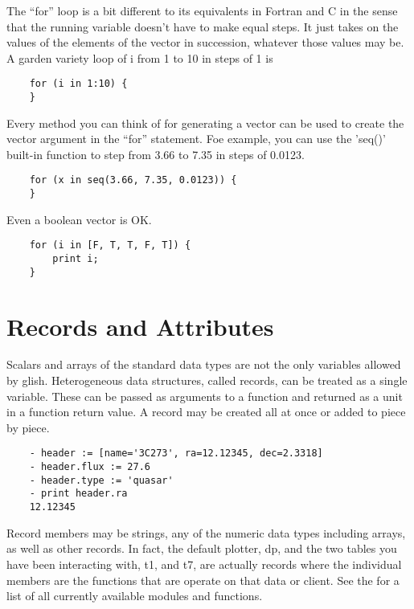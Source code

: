 The ``for'' loop is a bit different to its equivalents in Fortran and C in
the sense that the running variable doesn't have to make equal steps.  It
just takes on the values of the elements of the vector in succession,
whatever those values may be.  A garden variety loop of i from 1 to 10 in
steps of 1 is

\begin{verbatim}
	for (i in 1:10) {
	}
\end{verbatim}

Every method you can think of for generating a vector can be used to create
the vector argument in the ``for'' statement.  Foe example, you can use the
'seq()' built-in function to step from 3.66 to 7.35 in steps of 0.0123.

\begin{verbatim}
	for (x in seq(3.66, 7.35, 0.0123)) {
	}
\end{verbatim}

Even a boolean vector is OK.

\begin{verbatim}
	for (i in [F, T, T, F, T]) {
	    print i;
	}
\end{verbatim}

\section{Records and Attributes}

    Scalars and arrays of the standard data types are not the only
variables allowed by glish.  Heterogeneous data structures, called records,
can be treated as a single variable.  These can be passed as arguments to a
function and returned as a unit in a function return value.  A record may be
created all at once or added to piece by piece.

\begin{verbatim}
	- header := [name='3C273', ra=12.12345, dec=2.3318]
	- header.flux := 27.6
	- header.type := 'quasar'
	- print header.ra
	12.12345
\end{verbatim}

    Record members may be strings, any of the numeric data types
including arrays, as well as other records.  In fact, the default
plotter, dp, and the two tables you have been interacting
with, t1, and t7, are actually records where the individual members
are the functions that are operate on that data or client.
See the  for a list of
all currently available modules and functions.

